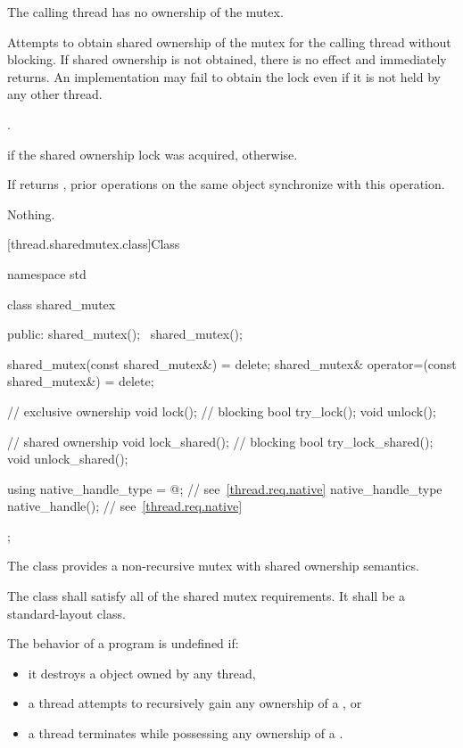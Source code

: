 \begin{itemdescr}
\pnum
\requires The calling thread has no ownership of the mutex.

\pnum
\effects Attempts to obtain shared ownership of the mutex for the calling
thread without blocking. If shared ownership is not obtained, there is no
effect and  immediately returns. An implementation
may fail to obtain the lock even if it is not held by any other thread.

\pnum
\returntype {}.

\pnum
\returns {} if the shared ownership lock was acquired, 
otherwise.

\pnum
\sync If  returns , prior 
operations on the same object synchronize with this
operation.

\pnum
\throws Nothing.
\end{itemdescr}

[thread.sharedmutex.class]{Class }

%
\begin{codeblock}
namespace std {
  class shared_mutex {
  public:
    shared_mutex();
    ~shared_mutex();

    shared_mutex(const shared_mutex&) = delete;
    shared_mutex& operator=(const shared_mutex&) = delete;

    // exclusive ownership
    void lock();                // blocking
    bool try_lock();
    void unlock();

    // shared ownership
    void lock_shared();         // blocking
    bool try_lock_shared();
    void unlock_shared();

    using native_handle_type = @\impdefnc@;          // see~\ref{thread.req.native}
    native_handle_type native_handle();                         // see~\ref{thread.req.native}
  };
}
\end{codeblock}

\pnum
The class  provides a non-recursive mutex
with shared ownership semantics.

\pnum
The class  shall satisfy all of the
shared mutex requirements.
It shall be a standard-layout class.

\pnum
The behavior of a program is undefined if:
\begin{itemize}
\item it destroys a  object owned by any thread,
\item a thread attempts to recursively gain any ownership of a , or
\item a thread terminates while possessing any ownership of a .
\end{itemize}

